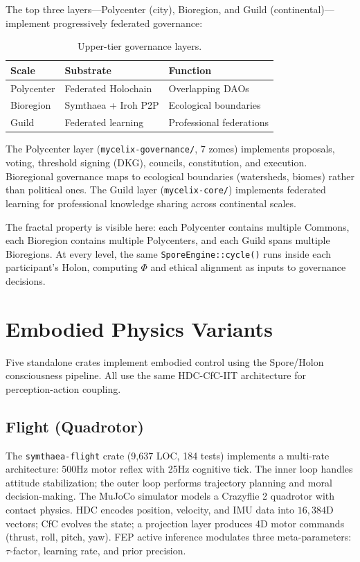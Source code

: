 \documentclass[11pt,twocolumn]{article}
\newcommand{\dimHDC}{16{,}384}
\begin{document}
The top three layers---Polycenter (city), Bioregion, and Guild (continental)---implement progressively federated governance:

\begin{table}[H]
\centering
\caption{Upper-tier governance layers.}
\label{tab:upper-tiers}
\begin{tabular}{lll}
\toprule
\textbf{Scale} & \textbf{Substrate} & \textbf{Function} \\
\midrule
Polycenter & Federated Holochain & Overlapping DAOs \\
Bioregion & Symthaea + Iroh P2P & Ecological boundaries \\
Guild & Federated learning & Professional federations \\
\bottomrule
\end{tabular}
\end{table}

The Polycenter layer (\texttt{mycelix-governance/}, 7 zomes) implements proposals, voting, threshold signing (DKG), councils, constitution, and execution. Bioregional governance maps to ecological boundaries (watersheds, biomes) rather than political ones. The Guild layer (\texttt{mycelix-core/}) implements federated learning for professional knowledge sharing across continental scales.

The fractal property is visible here: each Polycenter contains multiple Commons, each Bioregion contains multiple Polycenters, and each Guild spans multiple Bioregions. At every level, the same \texttt{SporeEngine::cycle()} runs inside each participant's Holon, computing $\Phi$ and ethical alignment as inputs to governance decisions.

\section{Embodied Physics Variants}
\label{sec:embodied}

Five standalone crates implement embodied control using the Spore/Holon consciousness pipeline. All use the same HDC-CfC-IIT architecture for perception-action coupling.

\subsection{Flight (Quadrotor)}

The \texttt{symthaea-flight} crate (9,637 LOC, 184 tests) implements a multi-rate architecture: 500Hz motor reflex with 25Hz cognitive tick. The inner loop handles attitude stabilization; the outer loop performs trajectory planning and moral decision-making. The MuJoCo simulator models a Crazyflie 2 quadrotor with contact physics. HDC encodes position, velocity, and IMU data into $\dimHDC$D vectors; CfC evolves the state; a projection layer produces 4D motor commands (thrust, roll, pitch, yaw). FEP active inference modulates three meta-parameters: $\tau$-factor, learning rate, and prior precision.
\end{document}
